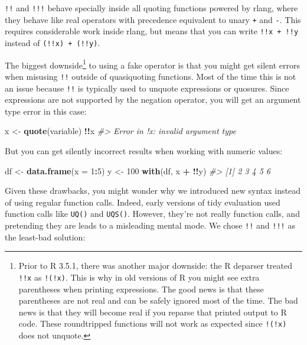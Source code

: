\documentclass[]{book}
\newenvironment{Shaded}{\begin{snugshade}}{\end{snugshade}}
\newcommand{\CommentTok}[1]{\textcolor[rgb]{0.37,0.37,0.37}{\textit{#1}}}
\newcommand{\DataTypeTok}[1]{\textcolor[rgb]{0.27,0.27,0.27}{#1}}
\newcommand{\DecValTok}[1]{\textcolor[rgb]{0.06,0.06,0.06}{#1}}
\newcommand{\KeywordTok}[1]{\textcolor[rgb]{0.27,0.27,0.27}{\textbf{#1}}}
\newcommand{\NormalTok}[1]{#1}
\newcommand{\OperatorTok}[1]{\textcolor[rgb]{0.43,0.43,0.43}{\textbf{#1}}}
\newcommand{\StringTok}[1]{\textcolor[rgb]{0.5,0.5,0.5}{#1}}
\let\rmarkdownfootnote\footnote%
\def\footnote{\protect\rmarkdownfootnote}
\begin{document}
\texttt{!!} and \texttt{!!!} behave specially inside all quoting functions powered by rlang, where they behave like real operators with precedence equivalent to unary \texttt{+} and \texttt{-}. This requires considerable work inside rlang, but means that you can write \texttt{!!x\ +\ !!y} instead of \texttt{(!!x)\ +\ (!!y)}.

The biggest downside\footnote{Prior to R 3.5.1, there was another major downside: the R deparser treated \texttt{!!x} as \texttt{!(!x)}. This is why in old versions of R you might see extra parentheses when printing expressions. The good news is that these parentheses are not real and can be safely ignored most of the time. The bad news is that they will become real if you reparse that printed output to R code. These roundtripped functions will not work as expected since \texttt{!(!x)} does not unquote.} to using a fake operator is that you might get silent errors when misusing \texttt{!!} outside of quasiquoting functions. Most of the time this is not an issue because \texttt{!!} is typically used to unquote expressions or quosures. Since expressions are not supported by the negation operator, you will get an argument type error in this case:

\begin{Shaded}
\begin{Highlighting}[]
\NormalTok{x <-}\StringTok{ }\KeywordTok{quote}\NormalTok{(variable)}
\OperatorTok{!!}\NormalTok{x}
\CommentTok{#> Error in !x: invalid argument type}
\end{Highlighting}
\end{Shaded}

But you can get silently incorrect results when working with numeric values:

\begin{Shaded}
\begin{Highlighting}[]
\NormalTok{df <-}\StringTok{ }\KeywordTok{data.frame}\NormalTok{(}\DataTypeTok{x =} \DecValTok{1}\OperatorTok{:}\DecValTok{5}\NormalTok{)}
\NormalTok{y <-}\StringTok{ }\DecValTok{100}
\KeywordTok{with}\NormalTok{(df, x }\OperatorTok{+}\StringTok{ }\OperatorTok{!!}\NormalTok{y)}
\CommentTok{#> [1] 2 3 4 5 6}
\end{Highlighting}
\end{Shaded}

Given these drawbacks, you might wonder why we introduced new syntax instead of using regular function calls. Indeed, early versions of tidy evaluation used function calls like \texttt{UQ()} and \texttt{UQS()}. However, they're not really function calls, and pretending they are leads to a misleading mental mode. We chose \texttt{!!} and \texttt{!!!} as the least-bad solution:
\end{document}
